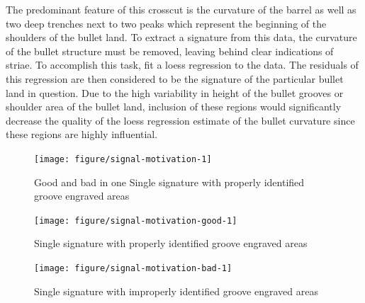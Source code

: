 \documentclass[12pt]{article}\usepackage[]{graphicx}\usepackage[]{color}
\newenvironment{knitrout}{}{} %
\theoremstyle{nonumberplain}
\begin{document}
The predominant feature of this crosscut is the curvature of the barrel as well as two deep trenches next to two peaks which represent the beginning of the shoulders of the bullet land. To extract a signature from this data, the curvature of the bullet structure must be removed, leaving behind clear indications of striae. To accomplish this task, \cite{hare2017} fit a loess regression to the data. The residuals of this regression are then considered to be the signature of the particular bullet land in question. Due to the high variability in height of the bullet grooves or shoulder area of the bullet land, inclusion of these regions would significantly decrease the quality of the loess regression estimate of the bullet curvature since these regions are highly influential. 

\begin{knitrout}
\color{fgcolor}\begin{figure}[H]

{\centering \texttt{[image: figure/signal-motivation-1]} 

}

\caption[Good and bad in one Single signature with properly identified groove engraved areas]{Good and bad in one Single signature with properly identified groove engraved areas}\label{fig:signal-motivation}
\end{figure}


\end{knitrout}

\begin{knitrout}
\color{fgcolor}\begin{figure}[H]

{\centering \texttt{[image: figure/signal-motivation-good-1]} 

}

\caption[Single signature with properly identified groove engraved areas]{Single signature with properly identified groove engraved areas}\label{fig:signal-motivation-good}
\end{figure}


\end{knitrout}


\begin{knitrout}
\color{fgcolor}\begin{figure}[H]

{\centering \texttt{[image: figure/signal-motivation-bad-1]} 

}

\caption[Single signature with improperly identified groove engraved areas]{Single signature with improperly identified groove engraved areas}\label{fig:signal-motivation-bad}
\end{figure}


\end{knitrout}
\end{document}
